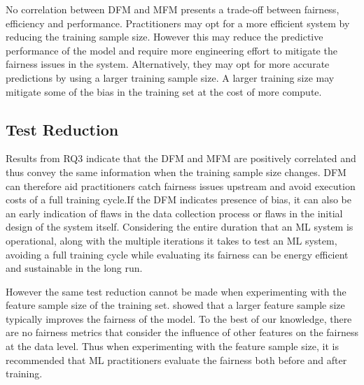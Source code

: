\documentclass[conference,review,anonymous]{IEEEtran}
\begin{document}
No correlation between DFM and MFM presents a trade-off between
fairness, efficiency and performance. Practitioners may opt for a more
efficient system by reducing the training sample size. However this
may reduce the predictive performance of the model and require more
engineering effort to mitigate the fairness issues in the system.
Alternatively, they may opt for more accurate predictions by using a
larger training sample size. A larger training size may mitigate some
of the bias in the training set at the cost of more compute.

\subsection{Test Reduction}\label{sec:discuss-test-red}

Results from RQ3 indicate that the DFM and MFM are positively
correlated and thus convey the same information when the training
sample size changes. DFM can therefore aid practitioners catch
fairness issues upstream and avoid execution costs of a full training
cycle.If the DFM indicates presence of bias, it can also be an early
indication of flaws in the data collection process or flaws in the
initial design of the system itself. Considering the entire duration
that an ML system is operational, along with the multiple iterations
it takes to test an ML system, avoiding a full training cycle while
evaluating its fairness can be energy efficient and sustainable in the
long run.

However the same test reduction cannot be made when experimenting with
the feature sample size of the training
set. \cite{zhang2021ignorance} showed that a larger feature sample
size typically improves the fairness of the model. To the best of our
knowledge, there are no fairness metrics that consider the influence
of other features on the fairness at the data level. Thus when
experimenting with the feature sample size, it is recommended that ML
practitioners evaluate the fairness both before and after training.


\end{document}
